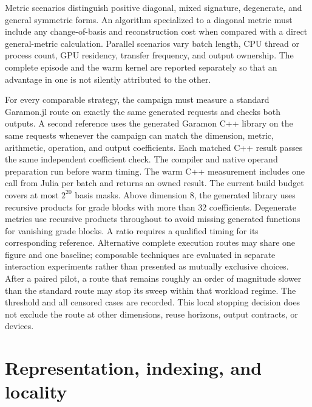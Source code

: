 \documentclass[11pt,a4paper]{article}
\begin{document}
Metric scenarios distinguish positive diagonal, mixed signature,
degenerate, and general symmetric forms. An algorithm specialized to a
diagonal metric must include any change-of-basis and reconstruction
cost when compared with a direct general-metric calculation. Parallel
scenarios vary batch length, CPU thread or process count, GPU residency,
transfer frequency, and output ownership. The complete episode and the
warm kernel are reported separately so that an advantage in one is not
silently attributed to the other.

For every comparable strategy, the campaign must measure a standard
Garamon.jl route on exactly the same generated requests and checks both
outputs. A second reference uses the generated Garamon C++ library on
the same requests whenever the campaign can match the dimension, metric,
arithmetic, operation, and output coefficients. Each matched C++ result
passes the same independent coefficient check. The compiler and native
operand preparation run before warm timing. The warm C++ measurement
includes one call from Julia per batch and returns an owned result.
The current build budget covers at most \(2^{20}\) basis masks. Above
dimension 8, the generated library uses recursive products for grade
blocks with more than 32 coefficients. Degenerate metrics use recursive
products throughout to avoid missing generated functions for vanishing
grade blocks. A ratio requires a qualified timing for its corresponding
reference.
Alternative complete execution routes may share one figure and one
baseline; composable techniques are evaluated in separate interaction
experiments rather than presented as mutually exclusive choices.
After a paired pilot, a route that remains roughly an order of magnitude
slower than the standard route may stop its sweep within that workload
regime. The threshold and all censored cases are recorded. This local
stopping decision does not exclude the route at other dimensions, reuse
horizons, output contracts, or devices.

\section{Representation, indexing, and locality}
\end{document}

